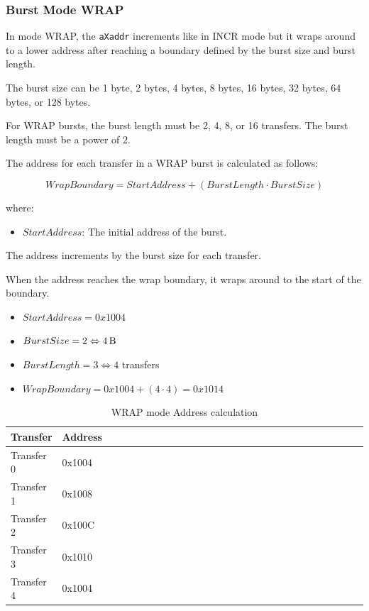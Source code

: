 \newpage
\subsubsection{Burst Mode WRAP}

In mode WRAP, the \texttt{aXaddr} increments like in INCR mode but it wraps around to a lower address after reaching a boundary defined by the burst size and burst length.

\subtitle{Burst Size}
The burst size can be 1 byte, 2 bytes, 4 bytes, 8 bytes, 16 bytes, 32 bytes, 64 bytes, or 128 bytes.

\subtitle{Burst Length}
For WRAP bursts, the burst length must be 2, 4, 8, or 16 transfers. The burst length must be a power of 2.

\subtitle{Address Calculation}
The address for each transfer in a WRAP burst is calculated as follows:

$$WrapBoundary = StartAddress + (BurstLength \cdot BurstSize)$$

where:
\begin{itemize}
    \item $StartAddress$: The initial address of the burst.
\end{itemize}

The address increments by the burst size for each transfer.

When the address reaches the wrap boundary, it wraps around to the start of the boundary.

\subtitle{Example}
\begin{itemize}
    \item $StartAddress = 0x1004$
    \item $BurstSize = 2 \Leftrightarrow \SI{4}{\byte}$ 
    \item $BurstLength = 3 \Leftrightarrow 4$ transfers
    \item $WrapBoundary = 0x1004 + (4 \cdot 4) = 0x1014$
\end{itemize}

\begin{table}[H]
\begin{threeparttable}
\caption{WRAP mode Address calculation}
\begin{tabularx}{\linewidth}{wm{0.5\linewidth} | wm{0.5\linewidth}}
\hline
\textbf{Transfer}   & \textbf{Address} \\ 
\hline        
Transfer 0 & 0x1004 \\
Transfer 1 & 0x1008 \\
Transfer 2 & 0x100C \\
Transfer 3 & 0x1010 \\
Transfer 4 & 0x1004 \\
\hline
\end{tabularx}
\end{threeparttable}
\end{table}

